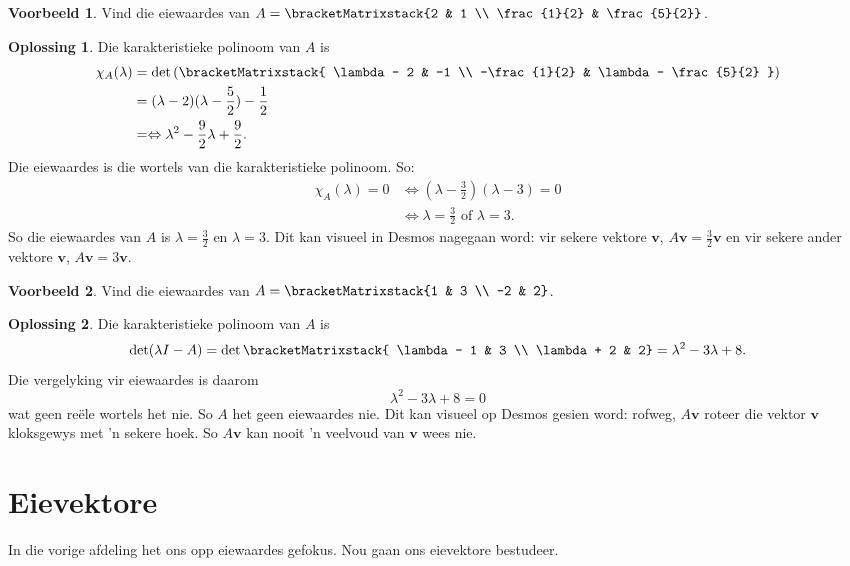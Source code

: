 \documentclass[a4paper,11pt]{book}
\theoremstyle{definition}
\newtheorem{example_environment}{Voorbeeld}[chapter]
\newtheorem*{solution}{Oplossing}
\newcommand{\ve}[1]{\mathbf{#1}}
\newcommand{\cmatrix}[1]{\bracketMatrixstack{#1}}
\newenvironment{example}
	{
		\begin{oframed}
		\begin{example_environment}
	}
	{
		\end{example_environment}
		\end{oframed}
	}
\begin{document}
\begin{example} \label{desmos_matrix} Vind die eiewaardes van $A = \cmatrix{2 & 1 \\ \frac{1}{2}
	& \frac{5}{2}}$.
	\begin{solution} 
		Die karakteristieke polinoom van $A$ is
		\begin{align*}
			\chi_A(\lambda) &= \det \left({\cmatrix{ \lambda - 2 & -1 \\
			-\frac{1}{2} & \lambda - \frac{5}{2} }} \right)  \\
			&= (\lambda - 2)(\lambda - \frac{5}{2}) - \frac{1}{2} \\
			&= \Leftrightarrow \lambda^2 - \frac{9}{2} \lambda +
			\frac{9}{2}.
		\end{align*}
		Die eiewaardes is die wortels van die karakteristieke polinoom. So:
		\begin{align*}
			\chi_A (\lambda) = 0 &\Leftrightarrow (\lambda -
			\frac{3}{2})(\lambda - 3) = 0 \\
			& \Leftrightarrow \lambda = \frac{3}{2} \text{ of } \lambda =
			3.
		\end{align*}
		So die eiewaardes van $A$ is $\lambda = \frac{3}{2}$ en $\lambda =
		3$. Dit kan visueel in Desmos nagegaan word: vir sekere vektore
		$\ve{v}$, $A \ve{v} = \frac{3}{2} \ve{v}$ en vir sekere ander
		vektore $\ve{v}$, $A \ve{v} = 3 \ve{v}$.
	\end{solution}
\end{example} 

\begin{example} Vind die eiewaardes van $A = \cmatrix{1 & 3 \\ -2 & 2}$.
	\begin{solution}
		Die karakteristieke polinoom van $A$ is 
		\[
			\det (\lambda I - A) = \det \cmatrix{ \lambda - 1 & 3 \\
			\lambda + 2 & 2} = \lambda^2 - 3\lambda + 8.
		\]
		Die vergelyking vir eiewaardes is daarom
		\[
			\lambda^2 - 3\lambda + 8 = 0
		\]
		wat geen re{\"e}le wortels het nie. So $A$ het geen eiewaardes nie.
		Dit kan visueel op Desmos gesien word: rofweg, $A\ve{v}$ roteer die
		vektor $\ve{v}$ kloksgewys met 'n sekere hoek. So $A \ve{v}$ kan
		nooit 'n veelvoud van $\ve{v}$ wees nie.
	\end{solution}
\end{example}

\section{Eievektore}
In die vorige afdeling het ons opp eiewaardes gefokus.  Nou gaan ons
eievektore bestudeer.
\end{document}
